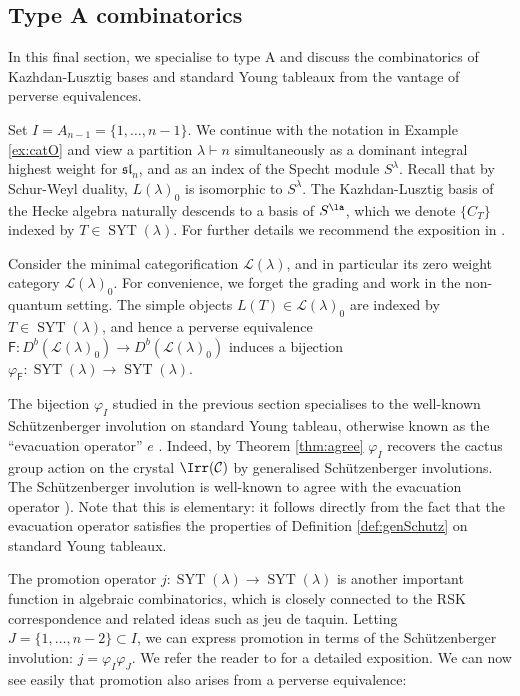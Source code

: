\documentclass[11pt,reqno]{amsart}
\numberwithin{equation}{section}
\theoremstyle{definition}
\theoremstyle{named}
\newcommand{\cC}{\mathcal{C}}
\newcommand{\sF}{\mathsf{F}}
\newcommand{\cL}{\mathcal{L}}
\DeclareMathOperator{\SYT}{SYT}
\newcommand{\fsl}{\mathfrak{sl}}
\begin{document}
\subsection{Type A combinatorics}\label{sec:typeA}

In this final section, we specialise to type A and discuss  the combinatorics of Kazhdan-Lusztig bases and standard Young tableaux from the vantage of perverse equivalences.   

Set  $I=A_{n-1}=\{1,\hdots,n-1\}$.
We continue with the notation in Example \ref{ex:catO} and view a partition $\lambda \vdash n$ simultaneously as a dominant integral highest weight for $\fsl_n$, and as an index of the Specht module $S^\lambda$. Recall that by Schur-Weyl duality, $L(\lambda)_0$ is isomorphic to $S^\lambda$.  The Kazhdan-Lusztig basis of the Hecke algebra naturally descends to a basis of $S^\la$, which we denote $\{C_T\}$ indexed by   $T\in\SYT(\lambda)$.  For further details we recommend the exposition in \cite{Rhoad}.  

Consider the  minimal categorification $\cL(\lambda)$, and in particular its zero weight category $\cL(\lambda)_0$.  For convenience, we forget the grading and work in the non-quantum setting.  The simple objects $L(T)  \in \cL(\lambda)_0$ are indexed by $T\in \SYT(\lambda)$, and hence a perverse equivalence $\sF:D^b( \cL(\lambda)_0) \to D^b( \cL(\lambda)_0)$ induces a bijection $\varphi_\sF:\SYT(\lambda) \to \SYT(\lambda)$.  

The bijection $\varphi_I$ studied in the previous section specialises to the well-known Sch\"utzenberger involution on standard Young tableau, otherwise known as the ``evacuation operator'' $e$ \cite{Sagan}.  Indeed, by Theorem \ref{thm:agree} $\varphi_I$ recovers the cactus group action on the crystal $\Irr(\cC)$ by generalised Sch\"utzenberger involutions.  The Sch\"utzenberger involution is well-known to agree with the evacuation operator \cite[Theorem A1.2.10]{StanleyII}).  Note that this is elementary: it follows directly from the fact that the evacuation operator satisfies the properties of Definition \ref{def:genSchutz} on standard Young tableaux.

The promotion operator $j:\SYT(\lambda)\to \SYT(\lambda)$ is another important function in algebraic combinatorics, which is closely connected to the RSK correspondence and related ideas such as jeu de taquin.  
Letting $J=\{1,\hdots,n-2\}\subset I$, we can express promotion in terms of the Sch\"utzenberger involution: $j=\varphi_I\varphi_{J}$.
We refer the reader to \cite{Sagan} for a detailed exposition.  We can now see easily that promotion also arises from a perverse equivalence:
\end{document}
